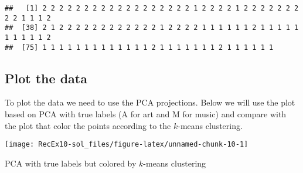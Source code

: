 \documentclass[
]{article}
\newenvironment{Shaded}{\begin{snugshade}}{\end{snugshade}}
\newcommand{\AttributeTok}[1]{\textcolor[rgb]{0.77,0.63,0.00}{#1}}
\newcommand{\CommentTok}[1]{\textcolor[rgb]{0.56,0.35,0.01}{\textit{#1}}}
\newcommand{\DecValTok}[1]{\textcolor[rgb]{0.00,0.00,0.81}{#1}}
\newcommand{\FunctionTok}[1]{\textcolor[rgb]{0.00,0.00,0.00}{#1}}
\newcommand{\NormalTok}[1]{#1}
\newcommand{\SpecialCharTok}[1]{\textcolor[rgb]{0.00,0.00,0.00}{#1}}
\newcommand{\StringTok}[1]{\textcolor[rgb]{0.31,0.60,0.02}{#1}}
\begin{document}
\begin{verbatim}
##   [1] 2 2 2 2 2 2 2 2 2 2 2 2 2 2 2 2 2 2 1 2 2 2 2 1 2 2 2 2 2 2 2 2 2 1 1 1 2
##  [38] 2 1 2 2 2 2 2 2 2 2 2 2 2 2 1 2 2 2 2 1 1 1 1 1 1 2 1 1 1 1 1 1 1 1 1 1 2
##  [75] 1 1 1 1 1 1 1 1 1 1 1 1 1 2 1 1 1 1 1 1 1 2 1 1 1 1 1 1
\end{verbatim}

\hypertarget{plot-the-data}{%
\subsection{Plot the data}\label{plot-the-data}}

To plot the data we need to use the PCA projections. Below we will use
the plot based on PCA with true labels (A for art and M for music) and
compare with the plot that color the points according to the \(k\)-means
clustering.

\begin{Shaded}
\end{Shaded}

\begin{center}\texttt{[image: RecEx10-sol\_files/figure-latex/unnamed-chunk-10-1]} \end{center}

PCA with true labels but colored by \(k\)-means clustering
\end{document}
